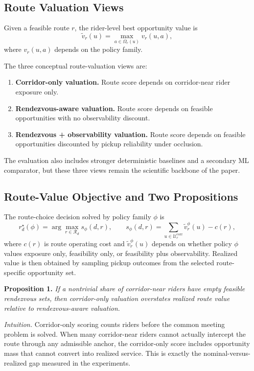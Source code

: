 \documentclass[journal]{IEEEtran}
\begin{document}
\subsection{Route Valuation Views}
Given a feasible route $r$, the rider-level best opportunity value is
\[
\tilde v_r(u) = \max_{a \in \Omega_r(u)} v_r(u,a),
\]
where $v_r(u,a)$ depends on the policy family.

The three conceptual route-valuation views are:
\begin{enumerate}
\item \textbf{Corridor-only valuation.} Route score depends on corridor-near rider exposure only.
\item \textbf{Rendezvous-aware valuation.} Route score depends on feasible opportunities with no observability discount.
\item \textbf{Rendezvous + observability valuation.} Route score depends on feasible opportunities discounted by pickup reliability under occlusion.
\end{enumerate}

The evaluation also includes stronger deterministic baselines and a secondary ML comparator, but these three views remain the scientific backbone of the paper.

\subsection{Route-Value Objective and Two Propositions}
The route-choice decision solved by policy family $\phi$ is
\[
r_d^\star(\phi) = \arg\max_{r \in \mathcal{R}_d} s_\phi(d,r), \qquad
s_\phi(d,r) = \sum_{u \in \mathcal{U}_r^{\mathrm{corr}}} \tilde v_r^\phi(u) - c(r),
\]
where $c(r)$ is route operating cost and $\tilde v_r^\phi(u)$ depends on whether policy $\phi$ values exposure only, feasibility only, or feasibility plus observability. Realized value is then obtained by sampling pickup outcomes from the selected route-specific opportunity set.

\textbf{Proposition 1.} \emph{If a nontrivial share of corridor-near riders have empty feasible rendezvous sets, then corridor-only valuation overstates realized route value relative to rendezvous-aware valuation.}

\emph{Intuition.} Corridor-only scoring counts riders before the common meeting problem is solved. When many corridor-near riders cannot actually intercept the route through any admissible anchor, the corridor-only score includes opportunity mass that cannot convert into realized service. This is exactly the nominal-versus-realized gap measured in the experiments.
\end{document}

